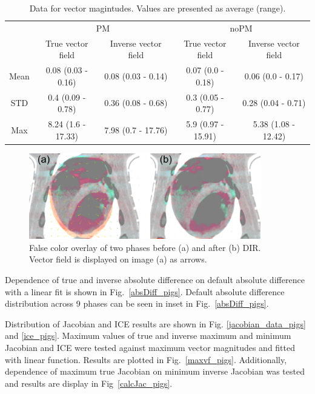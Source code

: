 \documentclass[type=dr, dr=rernat, accentcolor=tud7b,colorbacktitle, bigchapter, openright, twoside, 12pt ]{tudthesis}
\begin{document}
\begin{table}[H]
  \centering
  \caption{Data for vector magintudes. Values are presented as average (range).}
  \begin{tabular}{c|c|c|c|c}
	    & \multicolumn{2}{|c|}{PM} & \multicolumn{2}{|c|}{noPM} \\
  
            & True vector field   & Inverse vector field   & True vector field  & Inverse vector field \\
       \hline
	Mean & 0.08 (0.03 - 0.16) & 0.08 (0.03 - 0.14) & 0.07 (0.0 - 0.18)  & 0.06 (0.0 - 0.17) \\ 
	STD  & 0.4 (0.09 - 0.78)  & 0.36 (0.08 - 0.68) & 0.3 (0.05 - 0.77)  & 0.28 (0.04 - 0.71) \\ 
	Max  & 8.24 (1.6 - 17.33) & 7.98 (0.7 - 17.76) & 5.9 (0.97 - 15.91) & 5.38 (1.08 - 12.42) \\ 
    \hline\hline
  \end{tabular}
  \label{tab:vectordata_pig}
\end{table}

\begin{figure}[H]
	\begin{center}		
		\includegraphics[width=0.9\textwidth]{./Images/exampleReg_pigs.png}
		\caption{False color overlay of two phases before (a) and after (b) DIR. Vector field is displayed on image (a) as arrows.}
		\label{exampleReg_pigs}
	\end{center}
\end{figure}

Dependence of true and inverse absolute difference on default absolute difference with a linear fit is shown in Fig.~\ref{absDiff_pigs}. Default absolute difference distribution across 9 phases can be seen in inset in Fig.~\ref{absDiff_pigs}.

Distribution of Jacobian and ICE results are shown in Fig. \ref{jacobian_data_pigs} and \ref{ice_pigs}. Maximum values of true and inverse maximum and minimum Jacobian and ICE were tested 
against maximum vector magnitudes and fitted with linear function. Results are plotted in Fig.~\ref{maxvf_pigs}.
Additionally, dependence of maximum true Jacobian on minimum inverse Jacobian was tested and results are display in Fig~\ref{calcJac_pigs}.
\end{document}

